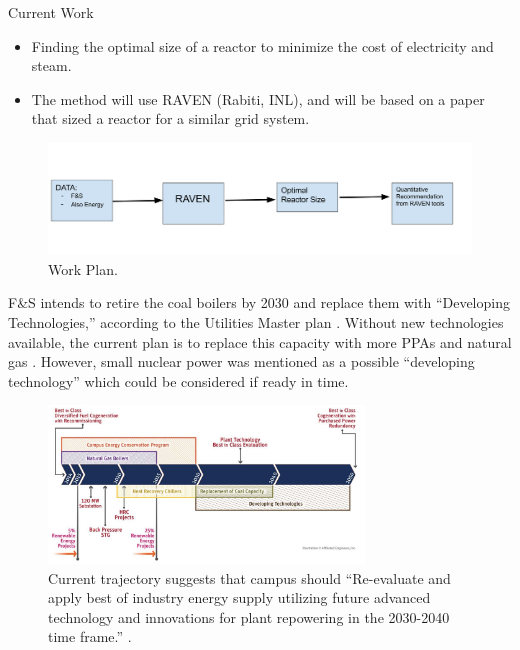 	
\begin{frame}
\large Current Work\\

	\begin{itemize}
		\item Finding the optimal size of a reactor to minimize the cost of electricity and steam. \\
                \item The method will use RAVEN (Rabiti, INL), and will be based on a paper 
                        \cite{baker_optimal_2018} that sized a reactor for a 
                        similar grid system.
	\end{itemize}
        \begin{figure}
                \centering
                \includegraphics[height=0.5\textheight]{./images/flow.png}
                \caption{Work Plan.}
        \end{figure}
\end{frame}

\begin{frame}
        F\&S intends to retire the coal boilers by 2030 and replace them with 
        ``Developing Technologies,'' according to the Utilities Master plan 
        \cite{affiliated_engineers_inc_utilities_2015}. Without new 
        technologies available, the current plan is to replace this capacity 
        with  more PPAs and natural gas 
        \cite{affiliated_engineers_inc_utilities_2015}. However, small nuclear 
        power was mentioned as a possible ``developing technology'' which could 
        be considered if ready in time. 

	\begin{figure}
		\centering
		\label{fig:masterplan}
		\includegraphics[width=0.75\textwidth]{./images/masterplan.png}
		\caption{Current trajectory suggests that campus should ``Re-evaluate and apply best of industry energy supply utilizing future advanced
technology and innovations for plant repowering in the 2030-2040 time frame.'' 
                \cite{affiliated_engineers_inc_utilities_2015}.}
	\end{figure}
\end{frame}
